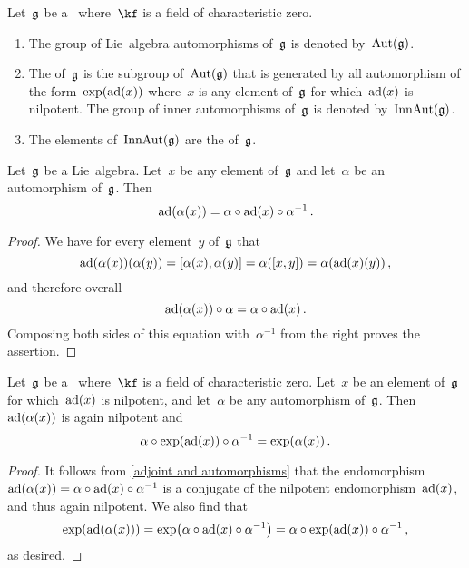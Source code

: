 \begin{definition}
	Let~$\mathfrak{g}$ be a~\liealgebra{$\kf$} where~$\kf$ is a field of characteristic zero.
	\begin{enumerate}
		\item
			The group of Lie~algebra automorphisms of~$\mathfrak{g}$ is denoted by~$\operatorname{Aut}(\mathfrak{g})$.
		\item
			The  of~$\mathfrak{g}$ is the subgroup of~$\operatorname{Aut}(\mathfrak{g})$ that is generated by all automorphism of the form~$\exp(\operatorname{ad}(x))$ where~$x$ is any element of~$\mathfrak{g}$ for which~$\operatorname{ad}(x)$ is nilpotent.
			The group of inner automorphisms of~$\mathfrak{g}$ is denoted by~$\operatorname{InnAut}(\mathfrak{g})$.
		\item
			The elements of~$\operatorname{InnAut}(\mathfrak{g})$ are the  of~$\mathfrak{g}$.
	\end{enumerate}
\end{definition}


\begin{lemma}
	\label{adjoint and automorphisms}
	Let~$\mathfrak{g}$ be a Lie~algebra.
	Let~$x$ be any element of~$\mathfrak{g}$ and let~$\alpha$ be an automorphism of~$\mathfrak{g}$.
	Then
	\[
		\operatorname{ad}(\alpha(x))
		=
		\alpha \circ \operatorname{ad}(x) \circ \alpha^{-1} \,.
	\]
\end{lemma}


\begin{proof}
	We have for every element~$y$ of~$\mathfrak{g}$ that
	\[
		\operatorname{ad}(\alpha(x))(\alpha(y))
		=
		[\alpha(x), \alpha(y)]
		=
		\alpha( [x,y] )
		=
		\alpha( \operatorname{ad}(x)(y) ) \,,
	\]
	and therefore overall
	\[
		\operatorname{ad}(\alpha(x)) \circ \alpha
		=
		\alpha \circ \operatorname{ad}(x) \,.
	\]
	Composing both sides of this equation with~$\alpha^{-1}$ from the right proves the assertion.
\end{proof}


\begin{lemma}
	\label{conjugation of inner automorphism}
	Let~$\mathfrak{g}$ be a~\liealgebra{$\kf$} where~$\kf$ is a field of characteristic zero.
	Let~$x$ be an element of~$\mathfrak{g}$ for which~$\operatorname{ad}(x)$ is nilpotent, and let~$\alpha$ be any automorphism of~$\mathfrak{g}$.
	Then~$\operatorname{ad}(\alpha(x))$ is again nilpotent and
	\[
		\alpha \circ \exp(\operatorname{ad}(x)) \circ \alpha^{-1}
		=
		\exp( \alpha(x) ) \,.
	\]
\end{lemma}


\begin{proof}
	It follows from \cref{adjoint and automorphisms} that the endomorphism~$\operatorname{ad}(\alpha(x)) = \alpha \circ \operatorname{ad}(x) \circ \alpha^{-1}$ is a conjugate of the nilpotent endomorphism~$\operatorname{ad}(x)$, and thus again nilpotent.
	We also find that
	\[
		\exp( \operatorname{ad}(\alpha(x)) )
		=
		\exp\bigl( \alpha \circ \operatorname{ad}(x) \circ \alpha^{-1} \bigr)
		=
		\alpha \circ \exp(\operatorname{ad}(x)) \circ \alpha^{-1} \,,
	\]
	as desired.
\end{proof}


